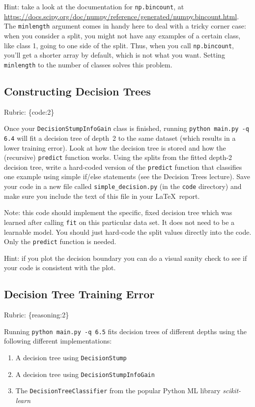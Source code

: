 \documentclass{article}
\def\rubric#1{\gre{Rubric: \{#1\}}}{}
\def\blu#1{{\color{blu}#1}}
\def\gre#1{{\color{gre}#1}}
\def\enum#1{\begin{enumerate}#1\end{enumerate}}
\begin{document}
Hint: take a look at the documentation for \texttt{np.bincount}, at \\
\url{https://docs.scipy.org/doc/numpy/reference/generated/numpy.bincount.html}. 
The \texttt{minlength} argument comes in handy here to deal with a tricky corner case:
when you consider a split, you might not have any examples of a certain class, like class 1,
going to one side of the split. Thus, when you call \texttt{np.bincount}, you'll get
a shorter array by default, which is not what you want. Setting \texttt{minlength} to the 
number of classes solves this problem.

\subsection{Constructing Decision Trees}
\rubric{code:2}

Once your \texttt{DecisionStumpInfoGain} class is finished, running \texttt{python main.py -q 6.4} will fit
a decision tree of depth~2 to the same dataset (which results in a lower training error).
Look at how the decision tree is stored and how the (recursive) \texttt{predict} function works.
\blu{Using the splits from the fitted depth-2 decision tree, write a hard-coded version of the \texttt{predict}
function that classifies one example using simple if/else statements
(see the Decision Trees lecture).} Save your code in a new file called
\texttt{simple\string_decision.py} (in the \texttt{code} directory) and make sure you include the text of this file in your \LaTeX \, report.

Note: this code should implement the specific, fixed decision tree
which was learned after calling \texttt{fit} on this particular data set. It does not need to be a learnable model.
You should just hard-code the split values directly into the code. Only the \texttt{predict} function is needed.

Hint: if you plot the decision boundary you can do a visual sanity check to see if your code is consistent with the plot.





\subsection{Decision Tree Training Error}
\rubric{reasoning:2}

Running \texttt{python main.py -q 6.5} fits decision trees of different depths using the following different implementations: 
\enum{
\item A decision tree using \texttt{DecisionStump}
\item A decision tree using \texttt{DecisionStumpInfoGain}
\item The \texttt{DecisionTreeClassifier} from the popular Python ML library \emph{scikit-learn}
}
\end{document}
